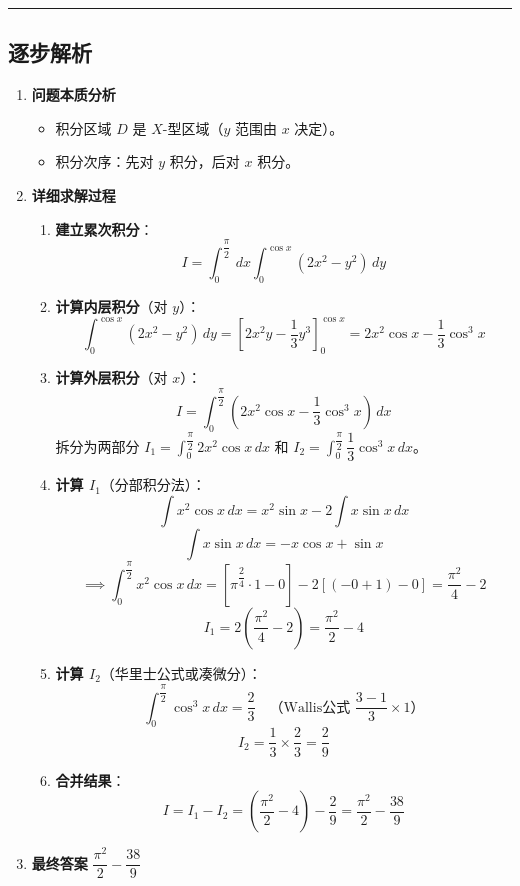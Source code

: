 \documentclass[UTF8,10pt]{ctexart}
\newenvironment{redenv}{\color{red}}{}
\newenvironment{detailedanalysis}{%
    \color{red}
    \begin{enumerate}[label=\textbf{第\arabic*步：}, leftmargin=*, align=left, itemsep=0pt, parsep=0pt, topsep=0pt, partopsep=0pt]
}{%
    \end{enumerate}
}
\newcommand{\analysisrule}{\noindent\rule{\textwidth}{0.8pt}\vspace{-0.5em}}
\begin{document}
\begin{redenv}
\analysisrule
\subsection*{逐步解析}

\begin{detailedanalysis}
\item \textbf{问题本质分析}
\begin{itemize}
    \item 积分区域 $D$ 是 $X$-型区域（$y$ 范围由 $x$ 决定）。
    \item 积分次序：先对 $y$ 积分，后对 $x$ 积分。
\end{itemize}

\item \textbf{详细求解过程}
\begin{enumerate}[label=(\alph*)]
    \item \textbf{建立累次积分}：
    \[ I = \int_0^{\dfrac{\pi}{2}}\, dx \int_0^{\cos x} (2x^2 - y^2)\, dy \]
    \item \textbf{计算内层积分}（对 $y$）：
    \[ \int_0^{\cos x} (2x^2 - y^2)\, dy = \left[ 2x^2 y - \dfrac{1}{3}y^3 \right]_0^{\cos x} = 2x^2\cos x - \dfrac{1}{3}\cos^3 x \]
    \item \textbf{计算外层积分}（对 $x$）：
    \[ I = \int_0^{\dfrac{\pi}{2}} \left( 2x^2\cos x - \dfrac{1}{3}\cos^3 x \right)\, dx \]
    拆分为两部分 $I_1 = \int_0^{\dfrac{\pi}{2}} 2x^2 \cos x \, dx$ 和 $I_2 = \int_0^{\dfrac{\pi}{2}} \dfrac{1}{3}\cos^3 x \, dx$。
    \item \textbf{计算 $I_1$}（分部积分法）：
    \[ \int x^2 \cos x\, dx = x^2\sin x - 2\int x\sin x\, dx \]
    \[ \int x\sin x\, dx = -x\cos x + \sin x \]
    \[ \implies \int_0^{\dfrac{\pi}{2}} x^2\cos x\, dx = [\pi^\dfrac{2}{4} \cdot 1 - 0] - 2[(-0+1) - 0] = \dfrac{\pi^2}{4} - 2 \]
    \[ I_1 = 2(\dfrac{\pi^2}{4} - 2) = \dfrac{\pi^2}{2} - 4 \]
    \item \textbf{计算 $I_2$}（华里士公式或凑微分）：
    \[ \int_0^{\dfrac{\pi}{2}} \cos^3 x\, dx = \dfrac{2}{3} \quad \text{（Wallis公式 } \dfrac{3-1}{3} \times 1 \text{）} \]
    \[ I_2 = \dfrac{1}{3} \times \dfrac{2}{3} = \dfrac{2}{9} \]
    \item \textbf{合并结果}：
    \[ I = I_1 - I_2 = \left(\dfrac{\pi^2}{2} - 4\right) - \dfrac{2}{9} = \dfrac{\pi^2}{2} - \dfrac{38}{9} \]
\end{enumerate}

\item \textbf{最终答案}
$\dfrac{\pi^2}{2} - \dfrac{38}{9}$
\end{detailedanalysis}


\end{redenv}
\end{document}
